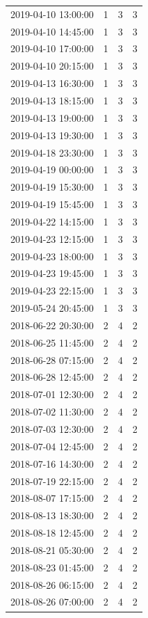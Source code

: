 \begin{tabular}{lrrr}
2019-04-10 13:00:00 & 1 & 3 & 3 \\
2019-04-10 14:45:00 & 1 & 3 & 3 \\
2019-04-10 17:00:00 & 1 & 3 & 3 \\
2019-04-10 20:15:00 & 1 & 3 & 3 \\
2019-04-13 16:30:00 & 1 & 3 & 3 \\
2019-04-13 18:15:00 & 1 & 3 & 3 \\
2019-04-13 19:00:00 & 1 & 3 & 3 \\
2019-04-13 19:30:00 & 1 & 3 & 3 \\
2019-04-18 23:30:00 & 1 & 3 & 3 \\
2019-04-19 00:00:00 & 1 & 3 & 3 \\
2019-04-19 15:30:00 & 1 & 3 & 3 \\
2019-04-19 15:45:00 & 1 & 3 & 3 \\
2019-04-22 14:15:00 & 1 & 3 & 3 \\
2019-04-23 12:15:00 & 1 & 3 & 3 \\
2019-04-23 18:00:00 & 1 & 3 & 3 \\
2019-04-23 19:45:00 & 1 & 3 & 3 \\
2019-04-23 22:15:00 & 1 & 3 & 3 \\
2019-05-24 20:45:00 & 1 & 3 & 3 \\
2018-06-22 20:30:00 & 2 & 4 & 2 \\
2018-06-25 11:45:00 & 2 & 4 & 2 \\
2018-06-28 07:15:00 & 2 & 4 & 2 \\
2018-06-28 12:45:00 & 2 & 4 & 2 \\
2018-07-01 12:30:00 & 2 & 4 & 2 \\
2018-07-02 11:30:00 & 2 & 4 & 2 \\
2018-07-03 12:30:00 & 2 & 4 & 2 \\
2018-07-04 12:45:00 & 2 & 4 & 2 \\
2018-07-16 14:30:00 & 2 & 4 & 2 \\
2018-07-19 22:15:00 & 2 & 4 & 2 \\
2018-08-07 17:15:00 & 2 & 4 & 2 \\
2018-08-13 18:30:00 & 2 & 4 & 2 \\
2018-08-18 12:45:00 & 2 & 4 & 2 \\
2018-08-21 05:30:00 & 2 & 4 & 2 \\
2018-08-23 01:45:00 & 2 & 4 & 2 \\
2018-08-26 06:15:00 & 2 & 4 & 2 \\
2018-08-26 07:00:00 & 2 & 4 & 2 \\

\end{tabular}

